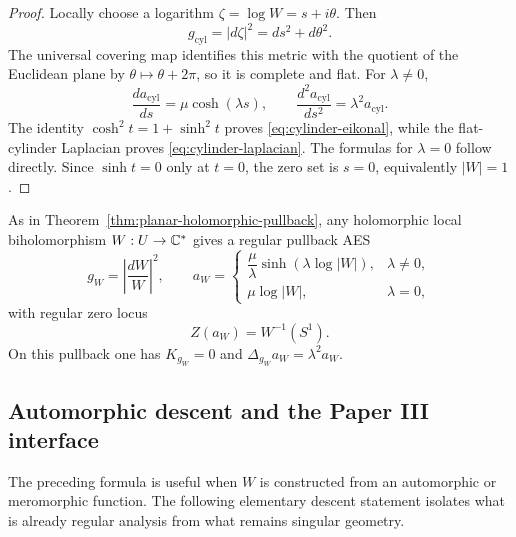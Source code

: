 \begin{proof}
Locally choose a logarithm \(\zeta=\log W=s+i\theta\).  Then
\[
 g_{\mathrm{cyl}}=|d\zeta|^2=ds^2+d\theta^2.
\]
The universal covering map identifies this metric with the quotient of the
Euclidean plane by \(\theta\mapsto\theta+2\pi\), so it is complete and flat.  For
\(\lambda\ne0\),
\[
 \frac{da_{\mathrm{cyl}}}{ds}=\mu\cosh(\lambda s),
 \qquad
 \frac{d^2a_{\mathrm{cyl}}}{ds^2}
 =\lambda^2a_{\mathrm{cyl}}.
\]
The identity \(\cosh^2t=1+\sinh^2t\) proves
\eqref{eq:cylinder-eikonal}, while the flat-cylinder Laplacian proves
\eqref{eq:cylinder-laplacian}.  The formulas for \(\lambda=0\) follow directly.
Since \(\sinh t=0\) only at \(t=0\), the zero set is \(s=0\), equivalently
\(|W|=1\).
\end{proof}

As in Theorem~\ref{thm:planar-holomorphic-pullback}, any holomorphic local
biholomorphism \(W:U\to\mathbb{C}^*\) gives a regular pullback AES
\begin{equation}\label{eq:cylinder-pullback-data}
 g_W=\left|\frac{dW}{W}\right|^2,
 \qquad
 a_W=
 \begin{cases}
  \dfrac{\mu}{\lambda}\sinh(\lambda\log|W|),&\lambda\ne0,\\[6pt]
  \mu\log|W|,&\lambda=0,
 \end{cases}
\end{equation}
with regular zero locus
\begin{equation}\label{eq:cylinder-pullback-zero-set}
 Z(a_W)=W^{-1}(S^1).
\end{equation}
On this pullback one has
\(K_{g_W}=0\) and \(\Delta_{g_W}a_W=\lambda^2a_W\).

\subsection{Automorphic descent and the Paper III interface}

The preceding formula is useful when \(W\) is constructed from an automorphic or
meromorphic function.  The following elementary descent statement isolates what is
already regular analysis from what remains singular geometry.

